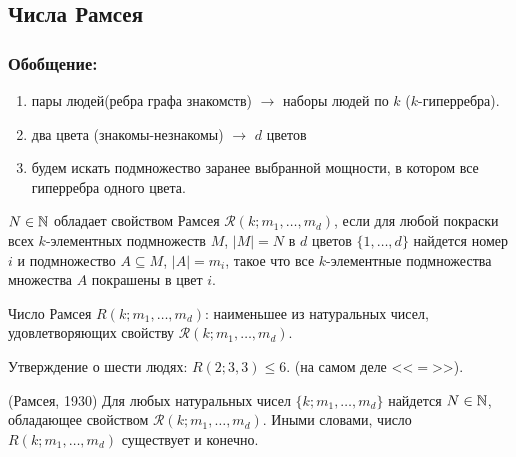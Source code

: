 \subsection{Числа Рамсея}
\subsubsection*{Обобщение:}

\begin{enumerate}
    \item пары людей(ребра графа знакомств) $\to$ наборы людей по $k$ ($k$-гиперребра).
    
    \item два цвета (знакомы-незнакомы) $\to$ $d$ цветов 
    
    \item будем искать подмножество заранее выбранной мощности, в котором все гиперребра одного цвета.
\end{enumerate}

\begin{defn}
    $N \in \mathbb{N}$ обладает свойством Рамсея $\mathcal{R}(k;m_1,\ldots,m_d)$, если для любой покраски всех $k$-элементных подмножеств $M$, $|M| = N$ в $d$ цветов $\{1,\ldots,d\}$ найдется номер $i$ и подмножество $A \subseteq M$, $|A| = m_i$, такое что все $k$-элементные подмножества множества $A$ покрашены в цвет $i$.  
\end{defn}

\begin{defn}
    Число Рамсея $R(k;m_1, \ldots, m_d)$: наименьшее из натуральных чисел, удовлетворяющих свойству $\mathcal{R}(k;m_1,\ldots,m_d)$.
\end{defn}

\begin{example}
    Утверждение о шести людях: $R(2;3,3) \leq 6$. (на самом деле <<$=$>>).
\end{example}

\begin{theorem}(Рамсея, 1930)
    Для любых натуральных чисел $\{k;m_1,\ldots,m_d\}$ найдется $N \in \mathbb{N}$, обладающее свойством $\mathcal{R}(k;m_1,\ldots,m_d)$. Иными словами, число $R(k;m_1,\ldots,m_d)$ существует и конечно.
\end{theorem}


